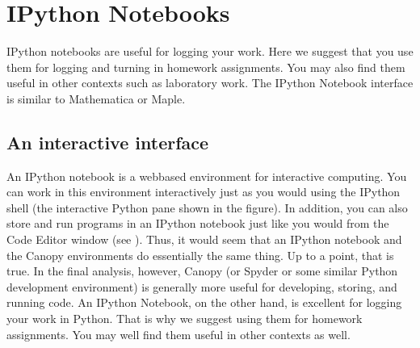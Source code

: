 \documentclass[letterpaper,10pt,english]{sphinxmanual}
\begin{document}
\begin{sphinxVerbatim}[commandchars=\\\{\},numbers=left,firstnumber=1,stepnumber=1]
 
      
\end{sphinxVerbatim}
\label{\detokenize{apdx2/apdx2_ipynb::doc}}\label{\detokenize{apdx2/apdx2_ipynb:apdx2}}
\ignorespaces 

\chapter{IPython Notebooks}
\label{\detokenize{apdx2/apdx2_ipynb:ipython-notebooks}}\label{\detokenize{apdx2/apdx2_ipynb:index-0}}
\sphinxAtStartPar
IPython notebooks are useful for logging your work.  Here we suggest that you use them for logging and turning in homework assignments.  You may also find them useful in other contexts such as laboratory work.  The IPython Notebook interface is similar to Mathematica or Maple.


\section{An interactive interface}
\label{\detokenize{apdx2/apdx2_ipynb:an-interactive-interface}}
\sphinxAtStartPar
An IPython notebook is a web\sphinxhyphen{}based environment for interactive computing.  You can work in this environment interactively just as you would using the IPython shell (the interactive Python pane shown in the {\hyperref[\detokenize{chap2/chap2_basics:fig-canopywindow}]{}} figure).  In addition, you can also store and run programs in an IPython notebook just like you would from the Code Editor window (see {\hyperref[\detokenize{chap2/chap2_basics:fig-canopywindow}]{}}).  Thus, it would seem that an IPython notebook and the Canopy environments do essentially the same thing.  Up to a point, that is true.  In the final analysis, however, Canopy (or Spyder or some similar Python development environment) is generally more useful for developing, storing, and running code.  An IPython Notebook, on the other hand, is excellent for logging your work in Python.  That is why we suggest using them for homework assignments.  You may well find them useful in other contexts as well.
\end{document}
